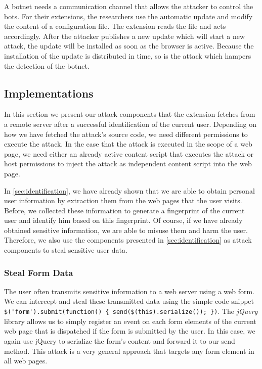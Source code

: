 	A botnet needs a communication channel that allows the attacker to control the bots. For their extensions, the researchers use the automatic update and modify the content of a configuration file. The extension reads the file and acts accordingly. After the attacker publishes a new update which will start a new attack, the update will be installed as soon as the browser is active. Because the installation of the update is distributed in time, so is the attack which hampers the detection of the botnet.
	
\subsection{Implementations}
	
	In this section we present our attack components that the extension fetches from a remote server after a successful identification of the current user. Depending on how we have fetched the attack's source code, we need different permissions to execute the attack. In the case that the attack is executed in the scope of a web page, we need either an already active content script that executes the attack or host permissions to inject the attack as independent content script into the web page.

	In \autoref{sec:identification}, we have already shown that we are able to obtain personal user information by extraction them from the web pages that the user visits. Before, we collected these information to generate a fingerprint of the current user and identify him based on this fingerprint. Of course, if we have already obtained sensitive information, we are able to misuse them and harm the user. Therefore, we also use the components presented in \autoref{sec:identification} as attack components to steal sensitive user data.

\subsubsection{Steal Form Data}
\label{sec:stealFormData}

	The user often transmits sensitive information to a web server using a web form. We can intercept and steal these transmitted data using the simple code snippet \lstinline|$('form').submit(function() { send($(this).serialize()); })|. The \textit{jQuery} library allows us to simply register an event on each form elements of the current web page that is dispatched if the form is submitted by the user. In this case, we again use jQuery to serialize the form's content and forward it to our send method. This attack is a very general approach that targets any form element in all web pages.
	
